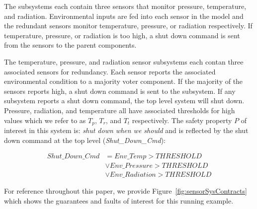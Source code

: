 The subsystems each contain three sensors that monitor pressure, temperature, and radiation. Environmental inputs are fed into each sensor in the model and the redundant sensors monitor temperature, pressure, or radiation respectively. If temperature, pressure, or radiation is too high, a shut down command is sent from the sensors to the parent components. 

The temperature, pressure, and radiation sensor subsystems each contan three associated sensors for redundancy. Each sensor reports the associated environmental condition to a majority voter component. If the majority of the sensors reports high, a shut down command is sent to the subsystem. If any subsystem reports a shut down command, the top level system will shut down. Pressure, radiation, and temperature all have associated thresholds for high values which we refer to as $T_p$, $T_r$, and $T_t$ respectively. The safety property $P$ of interest in this system is: \emph{shut down when we should} and is reflected by the shut down command at the top level ({\em Shut\_Down\_Cmd}):

\begin{equation*}
\begin{split}
Shut\_Down\_Cmd &=  Env\_Temp > THRESHOLD\\
  & \lor  Env\_Pressure > THRESHOLD\\
  & \lor Env\_Radiation > THRESHOLD
\end{split}
\end{equation*}

For reference throughout this paper, we provide Figure~\ref{fig:sensorSysContracts} which shows the guarantees and faults of interest for this running example. 


